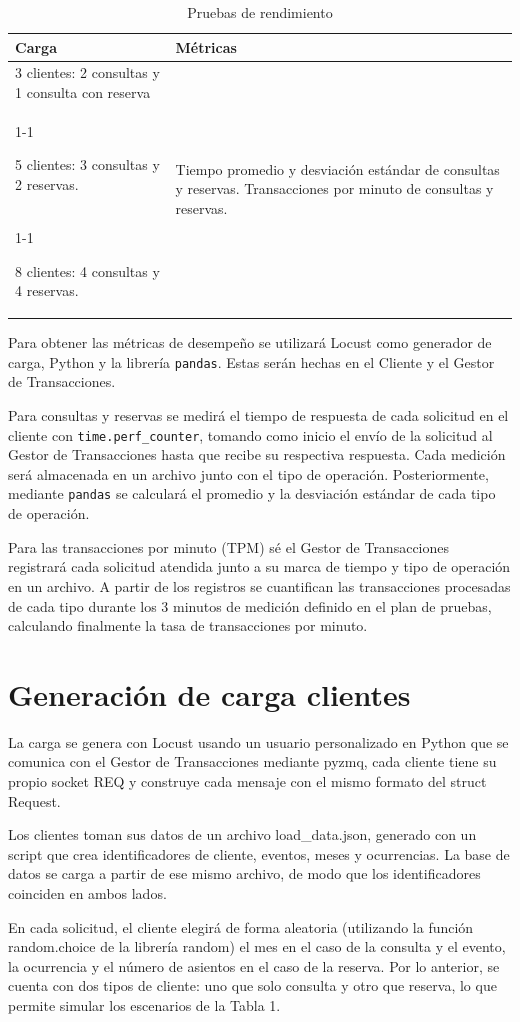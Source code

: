 \documentclass[conference]{IEEEtran}
\begin{document}
\begin{table}[htpb]
\centering
\caption{Pruebas de rendimiento}
\label{tab:pruebas_rendimiento}
\begin{tabularx}{\columnwidth}{|X|X|}
\hline
\textbf{Carga} & \textbf{Métricas} \\ \hline

3 clientes: 2 consultas y 1 consulta con reserva
&
\multirow{3}{\linewidth}{%
Tiempo promedio y desviación estándar de consultas y reservas. 
Transacciones por minuto de consultas y reservas.
}
\\ \cline{1-1}

5 clientes: 3 consultas y 2 reservas.
&
\\ \cline{1-1}

8 clientes: 4 consultas y 4 reservas.
&
\\ \hline

\end{tabularx}
\end{table}

Para obtener las métricas de desempeño se utilizará Locust como generador de carga, Python y la librería \texttt{pandas}.
Estas serán hechas en el Cliente y el Gestor de Transacciones.

Para consultas y reservas se medirá el tiempo de respuesta de cada solicitud en el cliente con \texttt{time.perf\_counter},
tomando como inicio el envío de la solicitud al Gestor de Transacciones hasta que recibe su respectiva respuesta.
Cada medición será almacenada en un archivo junto con el tipo de operación.
Posteriormente, mediante \texttt{pandas} se calculará el promedio y la desviación estándar de cada tipo de operación.

Para las transacciones por minuto (TPM) sé el Gestor de Transacciones registrará cada
solicitud atendida junto a su marca de tiempo y tipo de operación en un archivo. A partir de los registros
se cuantifican las transacciones procesadas de cada tipo durante los 3 minutos de medición definido en el plan de pruebas,
calculando finalmente la tasa de transacciones por minuto.


\section{Generación de carga clientes}
La carga se genera con Locust usando un usuario personalizado en Python que se comunica con el Gestor de Transacciones mediante pyzmq,
cada cliente tiene su propio socket REQ y construye cada mensaje con el mismo formato del struct Request.

Los clientes toman sus datos de un archivo load\_data.json, generado con un script que crea identificadores de cliente, eventos,
meses y ocurrencias. La base de datos se carga a partir de ese mismo archivo, de modo que los identificadores coinciden en ambos lados.

En cada solicitud, el cliente elegirá de forma aleatoria (utilizando la función random.choice de la librería random) el mes en el caso de
la consulta y el evento, la ocurrencia y el número de asientos en el caso de la reserva. Por lo anterior, se cuenta con dos tipos de
cliente: uno que solo consulta y otro que reserva, lo que permite simular los escenarios de la Tabla 1.
\end{document}
